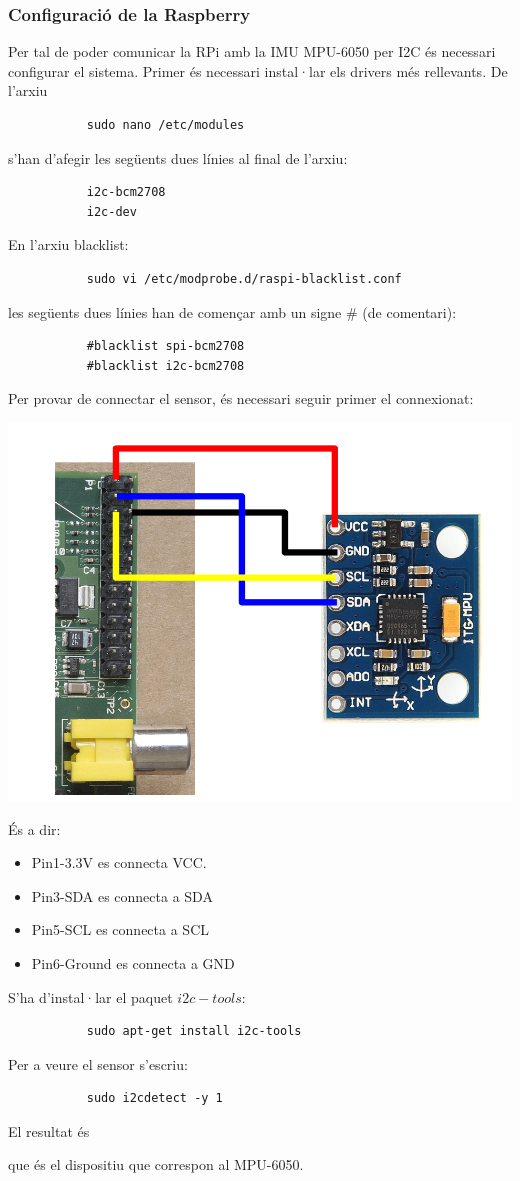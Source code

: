 \documentclass[twoside]{article}
\begin{document}
\subsubsection*{Configuració de la Raspberry}
Per tal de poder comunicar la RPi amb la IMU MPU-6050 per I2C és necessari configurar el sistema. Primer és necessari instal·lar els drivers més rellevants. De l'arxiu
\begin{verbatim}
           sudo nano /etc/modules
\end{verbatim}
s'han d'afegir les següents dues línies al final de l'arxiu:
\begin{verbatim}
           i2c-bcm2708
           i2c-dev
\end{verbatim}
En l'arxiu blacklist:
\begin{verbatim}
           sudo vi /etc/modprobe.d/raspi-blacklist.conf
\end{verbatim}
les següents dues línies han de començar amb un signe \# (de comentari):
\begin{verbatim}
           #blacklist spi-bcm2708
           #blacklist i2c-bcm2708
\end{verbatim}
Per provar de connectar el sensor, és necessari seguir primer el connexionat:
\begin{center}
\includegraphics[scale=0.2,viewport=0 200 800 720,clip]{ConSens.jpg}
\end{center}
És a dir:
\begin{itemize}
\item Pin1-3.3V es connecta VCC.
\item Pin3-SDA es connecta a SDA
\item Pin5-SCL es connecta a SCL
\item Pin6-Ground es connecta a GND
\end{itemize} 
S'ha d'instal·lar el paquet $i2c-tools$:
\begin{verbatim}
           sudo apt-get install i2c-tools
\end{verbatim}
Per a veure el sensor s'escriu:
\begin{verbatim}
           sudo i2cdetect -y 1
\end{verbatim}
El resultat és 
\begin{center}
\end{center}
que és el dispositiu que correspon al MPU-6050.
\end{document}
